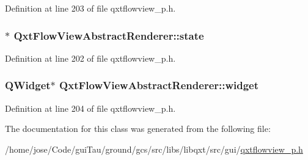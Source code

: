 Definition at line 203 of file qxtflowview\-\_\-p.\-h.

\hypertarget{class_qxt_flow_view_abstract_renderer_a094144abd273a72fae63aea927ee5c57}{
\subsubsection[{state}]{$\ast$ Qxt\-Flow\-View\-Abstract\-Renderer\-::state}}\label{class_qxt_flow_view_abstract_renderer_a094144abd273a72fae63aea927ee5c57}


Definition at line 202 of file qxtflowview\-\_\-p.\-h.

\hypertarget{class_qxt_flow_view_abstract_renderer_a9b3903131dd2d9efa8e3f3967dd12088}{
\subsubsection[{widget}]{\setlength{\rightskip}{0pt plus 5cm}Q\-Widget$\ast$ Qxt\-Flow\-View\-Abstract\-Renderer\-::widget}}\label{class_qxt_flow_view_abstract_renderer_a9b3903131dd2d9efa8e3f3967dd12088}


Definition at line 204 of file qxtflowview\-\_\-p.\-h.



The documentation for this class was generated from the following file\-:\begin{DoxyCompactItemize}
\item 
/home/jose/\-Code/gui\-Tau/ground/gcs/src/libs/libqxt/src/gui/\hyperlink{qxtflowview__p_8h}{qxtflowview\-\_\-p.\-h}\end{DoxyCompactItemize}
